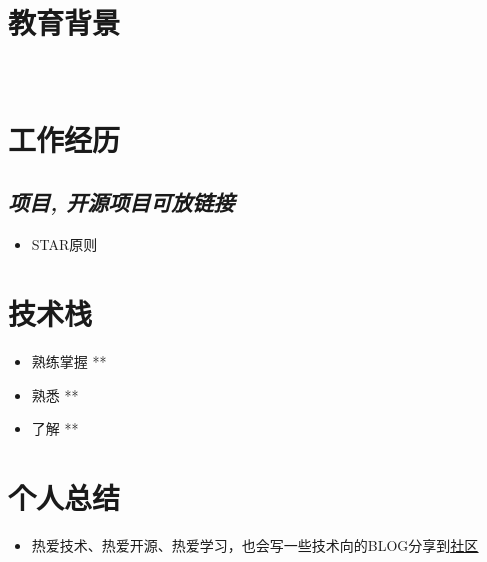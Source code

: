 \documentclass{resume}
\begin{document}



\section{教育背景}
\

\section{工作经历}
\subsection{\textit{项目, 开源项目可放链接}}
\begin{itemize}
  \item STAR原则
\end{itemize}

\section{技术栈}
\begin{itemize}
  \item 熟练掌握 **
  \item 熟悉 **
  \item 了解 **
\end{itemize}

\section{个人总结}
\begin{itemize}
  \item 热爱技术、热爱开源、热爱学习，也会写一些技术向的BLOG分享到\href {https://segmentfault.com/blog/xfslove}{\underline {社区}}
\end{itemize}
\end{document}
